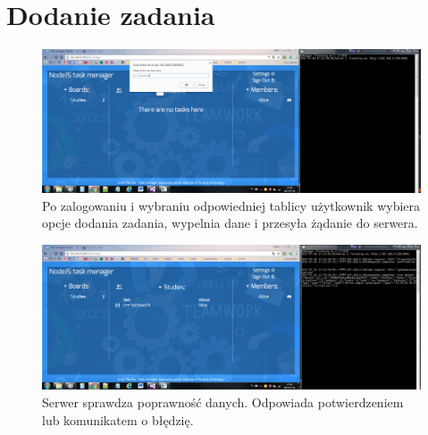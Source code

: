 \documentclass[12pt]{report}
\begin{document}
\section{Dodanie zadania}
\begin{figure}[!hb]
\centering
\includegraphics[width=\textwidth,height=\textheight,keepaspectratio]{A1.png}
\captionsetup{labelformat=empty}
\caption[]{Po zalogowaniu i wybraniu odpowiedniej tablicy użytkownik wybiera opcje dodania zadania, wypelnia dane i przesyła żądanie do serwera.}
\end{figure}
\begin{figure}[!hb]
\centering
\includegraphics[width=\textwidth,height=\textheight,keepaspectratio]{A2.png}
\captionsetup{labelformat=empty}
\caption[]{Serwer sprawdza poprawność danych. Odpowiada potwierdzeniem lub komunikatem o błędzię.}
\end{figure}
\end{document}
